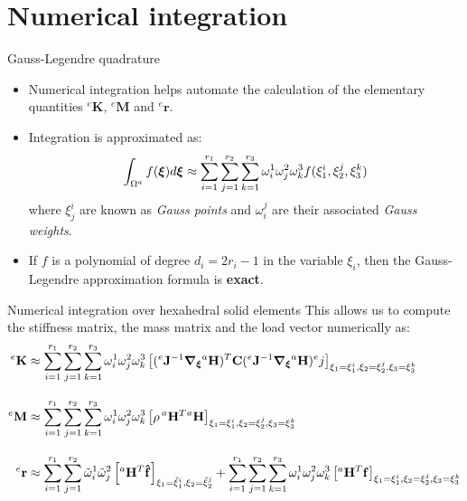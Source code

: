 \documentclass[aspectratio=169]{beamer}
\begin{document}
\section{Numerical integration}

\begin{frame}{Gauss-Legendre quadrature}
    \begin{itemize}
        \item Numerical integration helps automate the calculation of the elementary quantities ${}^e\mathbf K $, ${}^e\mathbf M$ and ${}^e\mathbf r$.
        \item Integration is approximated as:
              \begin{equation*}
                  \int_{\Omega^a}f(\boldsymbol\xi) d\boldsymbol\xi \approx \sum_{i=1}^{r_1} \sum_{j=1}^{r_2} \sum_{k=1}^{r_3} \omega_i^1 \omega_j^2 \omega_k^3 f(\xi_1^i, \xi_2^j, \xi_3^k)
              \end{equation*}
              where $\xi_j^i$ are known as \emph{Gauss points} and $\omega_i^j$ are their associated \emph{Gauss weights}.
    \end{itemize}
    \begin{tcolorbox}[colback=darkred!10,colframe=darkred!40!black,]
        \begin{itemize}
            \item[\HandRight]  If $f$ is a polynomial of degree $d_i=2r_i-1$ in the variable $\xi_i$, then the Gauss-Legendre approximation formula is \textbf{exact}.
        \end{itemize}
    \end{tcolorbox}
\end{frame}

\begin{frame}{Numerical integration over hexahedral solid elements}
    This allows us to compute the stiffness matrix, the mass matrix and the load vector numerically as:
    \begin{align*}
        {}^e\mathbf K & \approx\sum_{i=1}^{r_1} \sum_{j=1}^{r_2} \sum_{k=1}^{r_3} \omega_i^1 \omega_j^2 \omega_k^3 \left[ ( {}^e\mathbf J^{-1}\boldsymbol{\nabla}_{\boldsymbol\xi}{}^a\mathbf H)^T \mathbf C ({}^e\mathbf J^{-1}\boldsymbol{\nabla}_{\boldsymbol\xi} {}^a\mathbf H ) {}^e j \right]_{\xi_1=\xi_1^i, \xi_2=\xi_2^j, \xi_3=\xi_3^k}                                     \\[10pt]
        {}^e\mathbf M & \approx\sum_{i=1}^{r_1} \sum_{j=1}^{r_2} \sum_{k=1}^{r_3}  \omega_i^1 \omega_j^2 \omega_k^3 \left[  \rho\, {}^a\mathbf H^T{}^a\mathbf H \right]_{\xi_1=\xi_1^i, \xi_2=\xi_2^j, \xi_3=\xi_3^k}                                                                                                                                                   \\[10pt]
        {}^e\mathbf r & \approx\sum_{i=1}^{r_1} \sum_{j=1}^{r_2} \tilde\omega_i^1 \tilde\omega_j^2 \left[ {}^a\mathbf H^T\mathbf{\hat f} \right]_{\xi_1= \tilde\xi_1^i, \xi_2= \tilde\xi_2^j}+\sum_{i=1}^{r_1} \sum_{j=1}^{r_2} \sum_{k=1}^{r_3} \omega_i^1 \omega_j^2 \omega_k^3 \left[ {}^a\mathbf H^T\mathbf f \right]_{\xi_1=\xi_1^i, \xi_2=\xi_2^j, \xi_3=\xi_3^k}
    \end{align*}
\end{frame}
\end{document}
